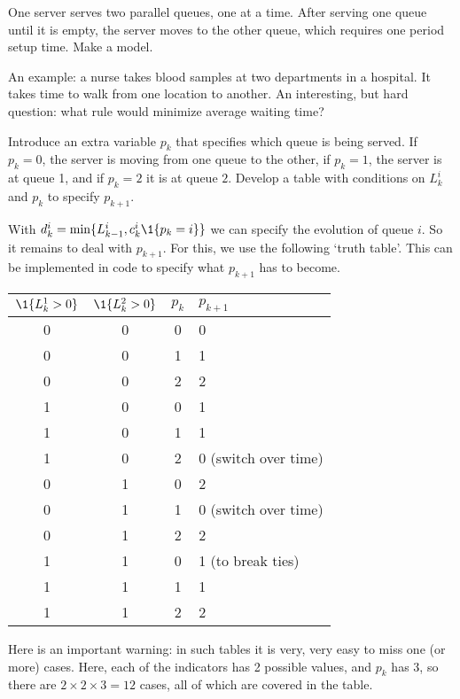 \begin{exercise}
 One 
 server serves two parallel queues, one at a time.
After serving
 one queue until it is empty, the server moves to the other
 queue, which requires one period setup time.  Make a model.

An example: a nurse takes blood samples at two departments in a hospital. It takes time to walk from one location to another. An interesting, but hard question: what rule would minimize average waiting time? 
\begin{hint}
  Introduce an extra variable $p_k$ that specifies which queue is being served.
  If $p_k=0$, the server is moving from one queue to the other, if $p_k=1$, the server is at queue 1, and if $p_k=2$ it is at queue $2$. Develop a table with conditions on $L_k^i$ and $p_k$ to specify $p_{k+1}$. 
\end{hint}
\begin{solution}
  With $d_k^i = \min\{\L^i_{k-1}, c_k^i \1{p_k=i}\}$ we can specify the evolution of queue $i$.
  So it remains to deal with $p_{k+1}$.
  For this, we use the following `truth table'. This can be implemented in code to specify what $p_{k+1}$ has to become.
  \begin{center}
\begin{tabular}{ccc|l}
 $\1{\L^1_k > 0}$ & $\1{\L_k^2 > 0}$ & $p_k$ & $p_{k+1}$ \\ \midrule
0 & 0 & 0 & 0 \\
0 & 0 & 1 & 1 \\
0 & 0 & 2 & 2 \\
1 & 0 & 0 & 1 \\
1 & 0 & 1 & 1 \\
1 & 0 & 2 & 0 (switch over time)\\
0 & 1 & 0 & 2 \\
0 & 1 & 1 & 0 (switch over time)\\
0 & 1 & 2 & 2 \\
1 & 1 & 0 & 1 (to break ties) \\
1 & 1 & 1 & 1 \\
1 & 1 & 2 & 2 \\
\end{tabular}
  \end{center}

  Here is an important warning: in such tables it is very, very easy to miss one (or more) cases.
  Here, each of the indicators has 2 possible values, and $p_k$ has 3, so there are $2 \times 2\times 3 = 12$ cases, all of which are covered in the table.
\end{solution}
\end{exercise}


